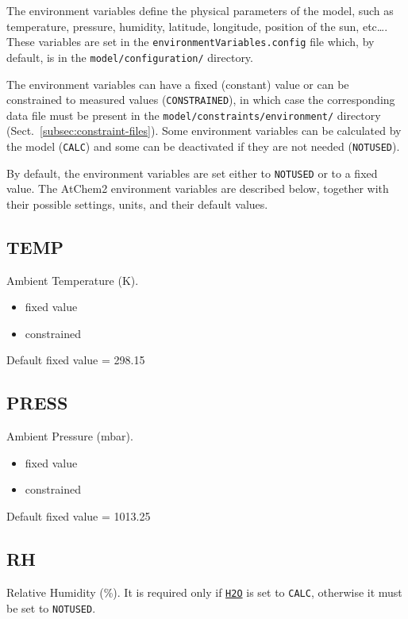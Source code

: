 The environment variables define the physical parameters of the model,
such as temperature, pressure, humidity, latitude, longitude, position
of the sun, etc\ldots. These variables are set in the
\texttt{environmentVariables.config} file which, by default, is in the
\texttt{model/configuration/} directory.

The environment variables can have a fixed (constant) value or can be
constrained to measured values (\texttt{CONSTRAINED}), in which case
the corresponding data file must be present in the
\texttt{model/constraints/environment/} directory
(Sect.~\ref{subsec:constraint-files}). Some environment variables can
be calculated by the model (\texttt{CALC}) and some can be deactivated
if they are not needed (\texttt{NOTUSED}).

By default, the environment variables are set either to \texttt{NOTUSED} or
to a fixed value. The AtChem2 environment variables are described
below, together with their possible settings, units, and their default
values.

\subsection{TEMP} \label{subsec:temp}

Ambient Temperature (K).

\begin{itemize}
\item fixed value
\item constrained
\end{itemize}

Default fixed value = 298.15

\subsection{PRESS} \label{subsec:press}

Ambient Pressure (mbar).

\begin{itemize}
\item fixed value
\item constrained
\end{itemize}

Default fixed value = 1013.25

\subsection{RH} \label{subsec:rh}

Relative Humidity (\%). It is required only if
\hyperref[subsec:h2o]{\texttt{H2O}} is set to \texttt{CALC}, otherwise
it must be set to \texttt{NOTUSED}.

